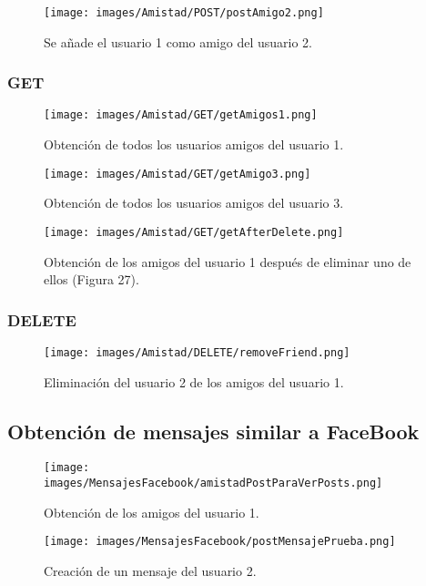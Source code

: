 \documentclass[12pt,a4paper, spanish]{article}
\begin{document}
\begin{figure}[H]
	\centering
	\texttt{[image: images/Amistad/POST/postAmigo2.png]}
	\caption{Se añade el usuario 1 como amigo del usuario 2.}
\end{figure}

\newpage
\subsubsection{GET}

\begin{figure}[H]
	\centering
	\texttt{[image: images/Amistad/GET/getAmigos1.png]}
	\caption{Obtención de todos los usuarios amigos del usuario 1.}
\end{figure}

\begin{figure}[H]
	\centering
	\texttt{[image: images/Amistad/GET/getAmigo3.png]}
	\caption{Obtención de todos los usuarios amigos del usuario 3.}
\end{figure}

\begin{figure}[H]
	\centering
	\texttt{[image: images/Amistad/GET/getAfterDelete.png]}
	\caption{Obtención de los amigos del usuario 1 después de eliminar uno de ellos (Figura 27).}
\end{figure}

\subsubsection{DELETE}
\begin{figure}[H]
	\centering
	\texttt{[image: images/Amistad/DELETE/removeFriend.png]}
	\caption{Eliminación del usuario 2 de los amigos del usuario 1.}
\end{figure}
\newpage

\subsection{Obtención de mensajes similar a FaceBook}
\begin{figure}[H]
	\centering
	\texttt{[image: images/MensajesFacebook/amistadPostParaVerPosts.png]}
	\caption{Obtención de los amigos del usuario 1.}
\end{figure}

\begin{figure}[H]
	\centering
	\texttt{[image: images/MensajesFacebook/postMensajePrueba.png]}
	\caption{Creación de un mensaje del usuario 2.}
\end{figure}
\end{document}
